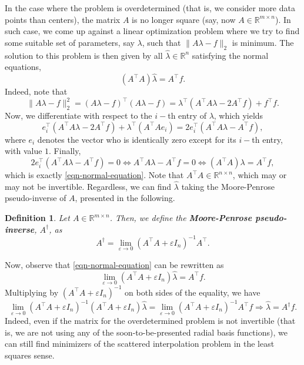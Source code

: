 \documentclass[12pt]{report} %
\newtheorem{definition}{Definition}
\newcommand{\tmstrong}[1]{\textbf{#1}}
\begin{document}
In the case where the problem is overdetermined (that is, we consider more data
points than centers), the matrix $A$ is no longer square (say, now $A \in
  \mathbb{R}^{m \times n}$). In such case, we come up against a linear optimization
problem where we try to find some suitable set of parameters, say $\lambda$,
such that $\| A \lambda - f \|_2$ is minimum. The solution to this problem is
then given by all $\hat{\lambda} \in \mathbb{R}^n$ satisfying the normal
equations,
\begin{equation}
  (A^{\top} A) \hat{\lambda} = A^{\top} f \label{eqn-normal-equation} .
\end{equation}
Indeed, note that
\[ \| A \lambda - f \|_2^2 = (A \lambda - f)^{\top} (A \lambda - f) =
  \lambda^{\top} (A^{\top} A \lambda - 2 A^{\top} f) + f^{\top} f. \]
Now, we differentiate with respect to the $i -$th entry of $\lambda$, which
yields
\[ e_i^{\top} (A^{\top} A \lambda - 2 A^{\top} f) + \lambda^{\top} (A^{\top} A
  e_i) = 2 e_i^{\top} (A^{\top} A \lambda - A^{\top} f), \]
where $e_i$ denotes the vector who is identically zero except for its $i -$th
entry, with value $1$. Finally,
\[ 2 e_i^{\top} (A^{\top} A \lambda - A^{\top} f) = 0 \Leftrightarrow
  A^{\top} A \lambda - A^{\top} f = 0 \Leftrightarrow (A^{\top} A) \lambda =
  A^{\top} f, \]
which is exactly \eqref{eqn-normal-equation}. Note that $A^{\top} A \in
  \mathbb{R}^{n \times n}$, which may or may not be invertible. Regardless, we
can find $\hat{\lambda}$ taking the Moore-Penrose pseudo-inverse of $A$,
presented in the following.

\begin{definition}
  Let $A \in \mathbb{R}^{m \times n}$. Then, we define the
    {\tmstrong{Moore-Penrose pseudo-inverse}}, $A^{\dag}$, as
  \[ A^{\dag} = \lim_{\varepsilon \rightarrow 0} (A^{\top} A + \varepsilon
    I_n)^{- 1} A^{\top} . \]
\end{definition}

Now, observe that \eqref{eqn-normal-equation} can be rewritten as
\[ \lim_{\varepsilon \rightarrow 0} (A^{\top} A + \varepsilon I_n)
  \hat{\lambda} = A^{\top} f. \]
Multiplying by $(A^{\top} A + \varepsilon I_n)^{- 1}$ on both sides of the
equality, we have
\[ \lim_{\varepsilon \rightarrow 0} (A^{\top} A + \varepsilon I_n)^{- 1}
  (A^{\top} A + \varepsilon I_n) \hat{\lambda} = \lim_{\varepsilon
    \rightarrow 0} (A^{\top} A + \varepsilon I_n)^{- 1} A^{\top} f \Rightarrow
  \hat{\lambda} = A^{\dag} f. \]
Indeed, even if the matrix for the overdetermined problem is not invertible
(that is, we are not using any of the soon-to-be-presented radial basis
functions), we can still find minimizers of the scattered interpolation
problem in the least squares sense.
\end{document}
